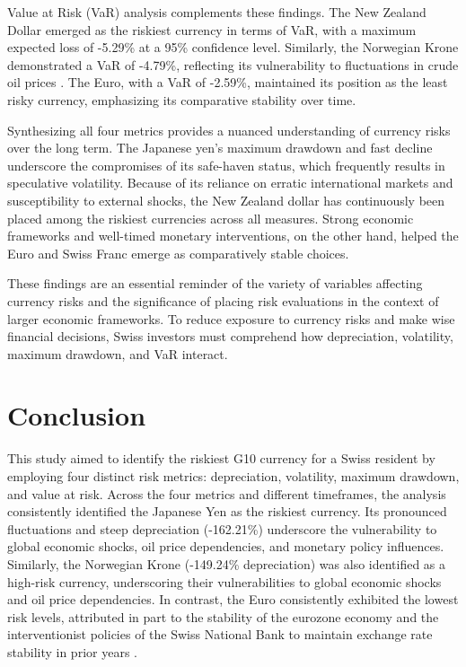 \documentclass[11pt,a4paper,english,oneside]{book}
\begin{document}
Value at Risk (VaR) analysis complements these findings. The New Zealand Dollar emerged as the riskiest currency in terms of VaR, with a maximum expected loss of -5.29\% at a 95\% confidence level. Similarly, the Norwegian Krone demonstrated a VaR of -4.79\%, reflecting its vulnerability to fluctuations in crude oil prices \parencite{bergholt2016business}. The Euro, with a VaR of -2.59\%, maintained its position as the least risky currency, emphasizing its comparative stability over time.

Synthesizing all four metrics provides a nuanced understanding of currency risks over the long term. The Japanese yen's maximum drawdown and fast decline underscore the compromises of its safe-haven status, which frequently results in speculative volatility. Because of its reliance on erratic international markets and susceptibility to external shocks, the New Zealand dollar has continuously been placed among the riskiest currencies across all measures. Strong economic frameworks and well-timed monetary interventions, on the other hand, helped the Euro and Swiss Franc emerge as comparatively stable choices.

These findings are an essential reminder of the variety of variables affecting currency risks and the significance of placing risk evaluations in the context of larger economic frameworks. To reduce exposure to currency risks and make wise financial decisions, Swiss investors must comprehend how depreciation, volatility, maximum drawdown, and VaR interact.

\chapter{Conclusion}
This study aimed to identify the riskiest G10 currency for a Swiss resident by employing four distinct risk metrics: depreciation, volatility, maximum drawdown, and value at risk. Across the four metrics and different timeframes, the analysis consistently identified the Japanese Yen as the riskiest currency. Its pronounced fluctuations and steep depreciation (-162.21\%) underscore the vulnerability to global economic shocks, oil price dependencies, and monetary policy influences. Similarly, the Norwegian Krone (-149.24\% depreciation) was also identified as a high-risk currency, underscoring their vulnerabilities to global economic shocks and oil price dependencies. In contrast, the Euro consistently exhibited the lowest risk levels, attributed in part to the stability of the eurozone economy and the interventionist policies of the Swiss National Bank to maintain exchange rate stability in prior years \parencite{auer2015safe}.
\end{document}
